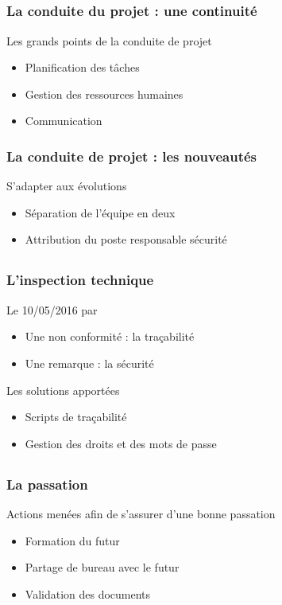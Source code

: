 \speaker{\Sergi{}}
\subsection{} %

\begin{frame}
\frametitle{La conduite du projet : une continuité}
\begin{block}{Les grands points de la conduite de projet}
\begin{itemize}
	\item Planification des tâches
	\item Gestion des ressources humaines
	\item Communication
\end{itemize}
\end{block}
\end{frame}

\begin{frame}
\frametitle{La conduite de projet : les nouveautés}
\begin{block}{S'adapter aux évolutions}
\begin{itemize}
	\item Séparation de l'équipe en deux
	\item Attribution du poste responsable sécurité
\end{itemize}
\end{block}

\end{frame}

\subsection{}
\begin{frame}
\frametitle{L'inspection technique}
\begin{block}{Le 10/05/2016 par \nomTuteurPedago{}}
\begin{itemize}
	\item Une non conformité : la traçabilité
	\item Une remarque : la sécurité
\end{itemize}
\end{block}
\begin{block}{Les solutions apportées}
\begin{itemize}
	\item Scripts de traçabilité
	\item Gestion des droits et des mots de passe
\end{itemize}
\end{block}
\end{frame}

\subsection{}
\begin{frame}
\frametitle{La passation}
\begin{block}{Actions menées afin de s'assurer d'une bonne passation}
\begin{itemize}
	\item Formation du futur \CP{}
	\item Partage de bureau avec le futur \CP{}
	\item Validation des documents
\end{itemize}
\end{block}
\end{frame}



